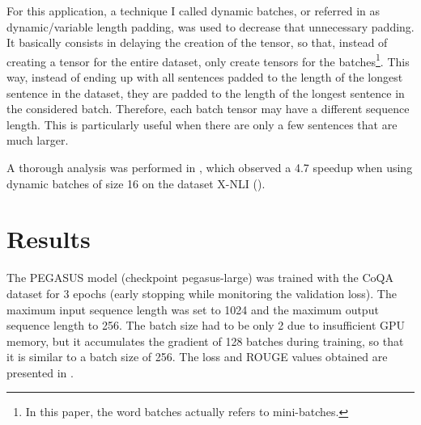 \documentclass[a4paper, 10pt]{article}
\begin{document}
            For this application, a technique I called dynamic batches, or referred in \cite{Benesty2020} as dynamic/variable length padding, was used to decrease that unnecessary padding. It basically consists in delaying the creation of the tensor, so that, instead of creating a tensor for the entire dataset, only create tensors for the batches\footnote{In this paper, the word batches actually refers to mini-batches.}. This way, instead of ending up with all sentences padded to the length of the longest sentence in the dataset, they are padded to the length of the longest sentence in the considered batch. Therefore, each batch tensor may have a different sequence length. This is particularly useful when there are only a few sentences that are much larger.
            
            A thorough analysis was performed in \cite{Benesty2020}, which observed a 4.7 speedup when using dynamic batches of size 16 on the dataset X-NLI (\cite{Conneau2018}).
    
\section{Results}

    The PEGASUS model (checkpoint pegasus-large) was trained with the CoQA dataset for 3 epochs (early stopping while monitoring the validation loss). The maximum input sequence length was set to 1024 and the maximum output sequence length to 256. The batch size had to be only 2 due to insufficient GPU memory, but it accumulates the gradient of 128 batches during training, so that it is similar to a batch size of 256. The loss and ROUGE values obtained  are presented in .
    
\end{document}
